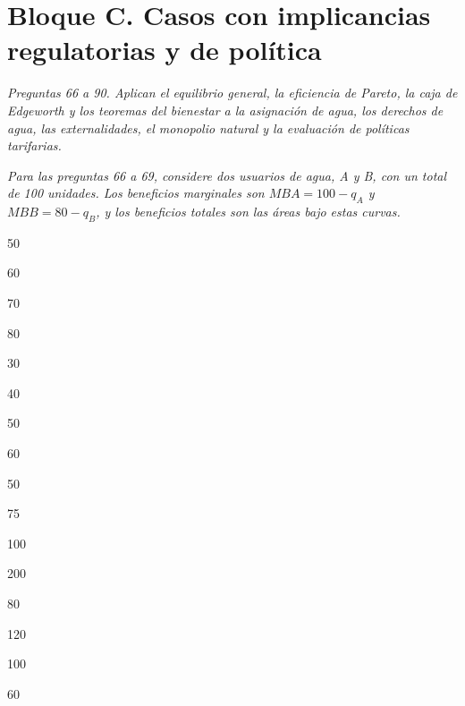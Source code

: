 \section*{Bloque C. Casos con implicancias regulatorias y de política}

\noindent\textit{Preguntas 66 a 90. Aplican el equilibrio general, la eficiencia de Pareto, la caja de Edgeworth y los teoremas del bienestar a la asignación de agua, los derechos de agua, las externalidades, el monopolio natural y la evaluación de políticas tarifarias.}

\noindent\textit{Para las preguntas 66 a 69, considere dos usuarios de agua, A y B, con un total de 100 unidades. Los beneficios marginales son $MBA=100-q_A$ y $MBB=80-q_B$, y los beneficios totales son las áreas bajo estas curvas.}

\begin{opts}
    \item 50
    \item 60
    \item 70
    \item 80
\end{opts}

\begin{opts}
    \item 30
    \item 40
    \item 50
    \item 60
\end{opts}

\begin{opts}
    \item 50
    \item 75
    \item 100
    \item 200
\end{opts}

\begin{opts}
    \item 80
    \item 120
    \item 100
    \item 60
\end{opts}

